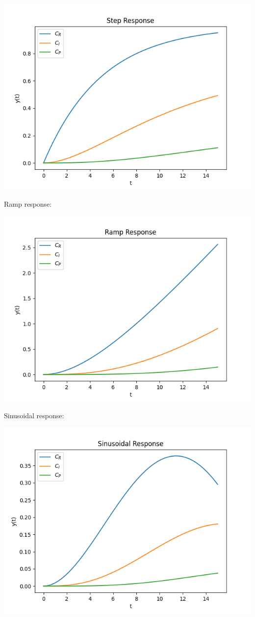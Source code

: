 \documentclass[12pt]{article}
\begin{document}
\begin{enumerate}
\begin{enumerate}
    \includegraphics{assets/p4_step.png}

    Ramp response: 

    \includegraphics{assets/p4_ramp.png}

    Sinusoidal response:

    \includegraphics{assets/p4_sin.png}


\end{enumerate}
\end{enumerate}
\end{document}
